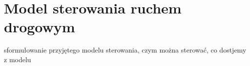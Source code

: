 \chapter{Model sterowania ruchem drogowym}
sformułowanie przyjętego modelu sterowania, czym można sterować, co dostjemy z modelu